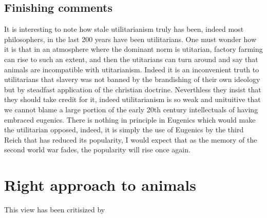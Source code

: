 \documentclass[12pt]{report}
\numberwithin{equation}{section}
\begin{document}
\subsection{Finishing comments}

It is interesting to note how stale utilitarianism truly has been, indeed most philosophers, in the last 200 years have been utilitarians. One must wonder how it is that in an atmosphere where the dominant norm is utitarian, factory farming can rise to such an extent, and then the utitarians can turn around and say that animals are incompatible with utitarianism. Indeed it is an inconvenient truth to utilitarians that slavery was not banned by the brandishing of their own ideology but by steadfast application of the christian doctrine. Neverthless they insist that they should take credit for it, indeed utilitarianism is so weak and unituitive that we cannot blame a large portion of the early 20th century intellectuals of having embraced eugenics. There is nothing in principle in Eugenics which would make the utilitarian opposed, indeed, it is simply the use of Eugenics by the third Reich that has reduced its popularity, I would expect that as the memory of the second world war fades, the popularity will rise once again. 


\section{Right approach to animals} 
This view has been critisized by \cite{Regan2020}
\end{document}
